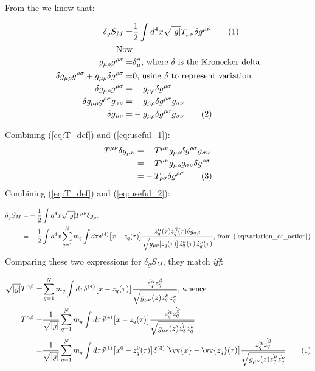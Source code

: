 \documentclass[]{article}
\newcommand\numberthis{\addtocounter{equation}{1}\tag{\theequation}}
\begin{document}
From the \cite[(73)]{akhmedev2016} we know that:

\begin{align*}
\delta_g S_M =& \frac{1}{2} \int d^4 x \sqrt{|g|} T_{\mu\nu} \delta g^{\mu\nu} \numberthis \label {eq:T_def} \\
\text{Now}&\\
g_{\mu\rho}g^{\rho\sigma} =& \delta_{\mu}^{\sigma} \text{, where $\delta$ is the Kronecker delta}\\
\delta g_{\mu\rho}g^{\rho\sigma} + g_{\mu\rho}\delta g^{\rho\sigma} =& 0 \text{, using $\delta$ to represent variation}\\
\delta g_{\mu\rho}g^{\rho\sigma} =& - g_{\mu\rho}\delta g^{\rho\sigma}\\
\delta g_{\mu\rho}g^{\rho\sigma} g_{\sigma\nu} =& - g_{\mu\rho}\delta g^{\rho\sigma} g_{\sigma\nu} \\
\delta g_{\mu\nu} =& - g_{\mu\rho}\delta g^{\rho\sigma} g_{\sigma\nu} \numberthis \label {eq:useful_1}
\end{align*}

Combining (\ref{eq:T_def}) and (\ref{eq:useful_1}):
\begin{align*}
T^{\mu\nu}\delta g_{\mu\nu} =& - T^{\mu\nu} g_{\mu\rho}\delta g^{\rho\sigma} g_{\sigma\nu}\\
=& - T^{\mu\nu} g_{\mu\rho} g_{\sigma\nu} \delta g^{\rho\sigma}\\
=& -T_{\rho\sigma}\delta g^{\rho\sigma} \numberthis \label {eq:useful_2}
\end{align*}
Combining (\ref{eq:T_def}) and (\ref{eq:useful_2}):

\begin{align*}
\delta_g S_M =& - \frac{1}{2} \int d^4 x \sqrt{|g|} T^{\mu\nu} \delta g_{\mu\nu}\\
=& - \frac{1}{2} \int d^4 x \sum_{q=1}^N m_q \int d \tau \delta^{(4)} \big[x - z_q(\tau)\big] \frac{ \dot{z}_q^\alpha(\tau) \dot{z}_q^\beta(\tau) \delta g_{\alpha\beta}}{ \sqrt{g_{\mu\nu}[z_q(\tau)] \, \dot{z}_q^\mu(\tau)\, \dot{z}_q^\nu(\tau)}} \text{, from (\ref{eq:variation_of_action})}
\end{align*}
Comparing these two expressions for $\delta_g S_M$, they match \emph{iff}:

\begin{align*}
\sqrt{|g|} T^{\alpha\beta} =&  \sum_{q=1}^{N} m_q \int d\tau \delta^{(4)} \big[x-z_q(\tau)\big]\frac{\dot{z_q^\alpha} \dot{z_q^\beta}}{\sqrt{g_{\mu\nu}(z)\dot{z_q^\mu}\dot{z_q^\nu}}} \text{, whence} \\
T^{\alpha\beta} =& \frac{1}{\sqrt{|g|}} \sum_{q=1}^{N} m_q \int d\tau \delta^{(4)} \big[x-z_q(\tau)\big]\frac{\dot{z_q^\alpha} \dot{z_q^\beta}}{\sqrt{g_{\mu\nu}(z)\dot{z_q^\mu}\dot{z_q^\nu}}} \\
=& \frac{1}{\sqrt{|g|}} \sum_{q=1}^{N} m_q \int d\tau \delta^{(1)} \big[x^0-z^0_q(\tau)\big]\delta^{(3)} \big[\vv{x}-\vv{z_q}(\tau)\big]\frac{\dot{z_q^\alpha} \dot{z_q^\beta}}{\sqrt{g_{\mu\nu}(z)\dot{z_q^\mu}\dot{z_q^\nu}}} \numberthis \label{eq:T_penult}
\end{align*}
\end{document}
